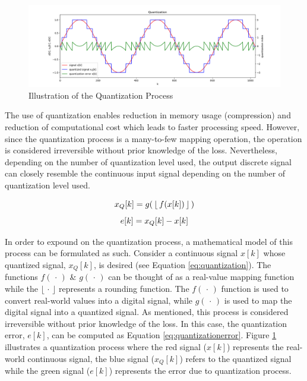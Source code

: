\begin{figure}[hbt!]
 \centering
 \includegraphics[width=\textwidth]{image/general/quantization.png}
 \caption{Illustration of the Quantization Process}
 \label{fig:quantize}
\end{figure}

The use of quantization enables reduction in memory usage (compression) and
reduction of computational cost which leads to faster processing speed.
However, since the quantization process is a many-to-few mapping
operation, the operation is considered irreversible without prior knowledge of
the loss. Nevertheless, depending on the number of quantization level used,
the output discrete signal can closely resemble the continuous input signal
depending on the number of quantization level used.

\begin{equation}
 \centering
 \label{eq:quantization}
 x_Q[k] = g(\mspace{3mu}\lfloor \mspace{3mu}f(x[k]) \mspace{3mu}\rfloor\mspace{3mu})
\end{equation}
\vspace{-3em}
\begin{equation}
 \centering
 \label{eq:quantizationerror}
 e[k] = x_Q[k] - x[k]
\end{equation}

In order to expound on the quantization process, a mathematical model of this
process can be formulated as such. Consider a continuous signal $x[k]$ whose
quantized signal, $x_Q[k]$, is desired (see Equation \ref{eq:quantization}). The
functions $f (\mspace{3mu} \cdot \mspace{3mu})$ \& $g (\mspace{3mu} \cdot\mspace{3mu})$
can be thought of as a real-value mapping function while the $\lfloor \mspace{3mu} \cdot
\mspace{3mu} \rfloor$ represents a rounding function. The $
f(\mspace{3mu} \cdot \mspace{3mu})$ function is used to
convert real-world values into a digital signal, while
$g (\mspace{3mu} \cdot\mspace{3mu})$ is used to map the digital signal into a
quantized signal. As mentioned, this process is considered irreversible without
prior knowledge of the loss. In this case, the quantization error, $e[k]$, can be
computed as Equation \ref{eq:quantizationerror}. Figure \ref{fig:quantize}
illustrates a quantization process where the red signal ($x[k]$) represents
the real-world continuous signal, the blue signal ($x_Q[k]$) refers to the
quantized signal while the green signal ($e[k]$) represents the error due to
quantization process.

